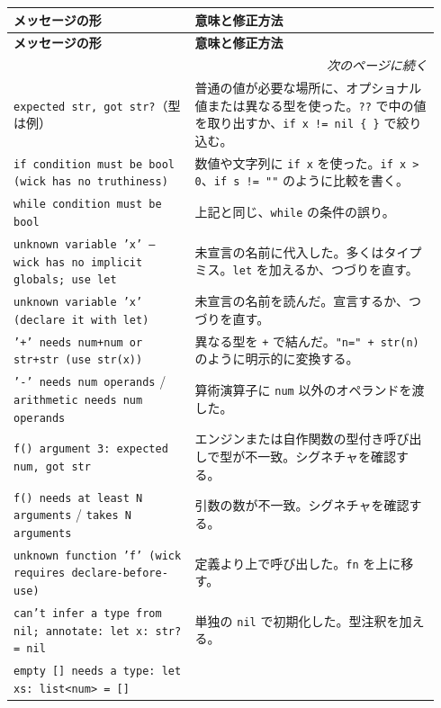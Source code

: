 \begingroup
\small
\begin{longtable}{@{}p{0.40\linewidth}p{0.54\linewidth}@{}}
\toprule
\textbf{メッセージの形} & \textbf{意味と修正方法} \\
\midrule
\endfirsthead
\toprule
\textbf{メッセージの形} & \textbf{意味と修正方法} \\
\midrule
\endhead
\midrule
\multicolumn{2}{r}{\emph{次のページに続く}} \\
\endfoot
\bottomrule
\endlastfoot

\texttt{expected str, got str?}（型は例） &
普通の値が必要な場所に、オプショナル値または異なる型を使った。\texttt{??} で中の値を取り出すか、\texttt{if x != nil \{ \}} で絞り込む。 \\
\addlinespace
\texttt{if condition must be bool (wick has no truthiness)} &
数値や文字列に \texttt{if x} を使った。\texttt{if x > 0}、\texttt{if s != ""} のように比較を書く。 \\
\addlinespace
\texttt{while condition must be bool} &
上記と同じ、\texttt{while} の条件の誤り。 \\
\addlinespace
\texttt{unknown variable 'x' --- wick has no implicit globals; use let} &
未宣言の名前に代入した。多くはタイプミス。\texttt{let} を加えるか、つづりを直す。 \\
\addlinespace
\texttt{unknown variable 'x' (declare it with let)} &
未宣言の名前を読んだ。宣言するか、つづりを直す。 \\
\addlinespace
\texttt{'+' needs num+num or str+str (use str(x))} &
異なる型を \texttt{+} で結んだ。\texttt{"n=" + str(n)} のように明示的に変換する。 \\
\addlinespace
\texttt{'-' needs num operands} / \texttt{arithmetic needs num operands} &
算術演算子に \texttt{num} 以外のオペランドを渡した。 \\
\addlinespace
\texttt{f() argument 3: expected num, got str} &
エンジンまたは自作関数の型付き呼び出しで型が不一致。シグネチャを確認する。 \\
\addlinespace
\texttt{f() needs at least N arguments} / \texttt{takes N arguments} &
引数の数が不一致。シグネチャを確認する。 \\
\addlinespace
\texttt{unknown function 'f' (wick requires declare-before-use)} &
定義より上で呼び出した。\texttt{fn} を上に移す。 \\
\addlinespace
\texttt{can't infer a type from nil; annotate: let x: str? = nil} &
単独の \texttt{nil} で初期化した。型注釈を加える。 \\
\addlinespace
\texttt{empty [] needs a type: let xs: list<num> = []} &

\end{longtable}

